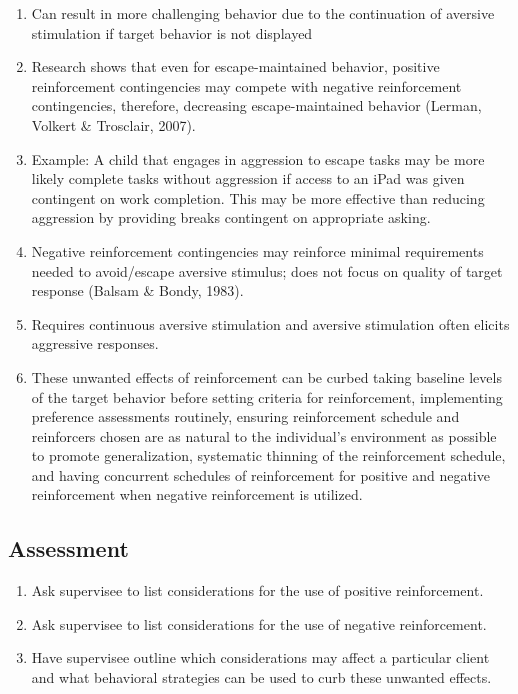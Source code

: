 \begin{enumerate}
\item Can result in more challenging behavior due to the continuation of aversive stimulation if target behavior is not displayed 
\item Research shows that even for escape-maintained behavior, positive reinforcement contingencies may compete with negative reinforcement contingencies, therefore, decreasing escape-maintained behavior (Lerman, Volkert \& Trosclair, 2007). 
\item Example: A child that engages in aggression to escape tasks may be more likely complete tasks without aggression if access to an iPad was given contingent on work completion. This may be more effective than reducing aggression by providing breaks contingent on appropriate asking.
\item Negative reinforcement contingencies may reinforce minimal requirements needed to avoid/escape aversive stimulus; does not focus on quality of target response (Balsam \& Bondy, 1983).
\item Requires continuous aversive stimulation and aversive stimulation often elicits aggressive responses.
\item These unwanted effects of reinforcement can be curbed taking baseline levels of the target behavior before setting criteria for reinforcement, implementing preference assessments routinely, ensuring reinforcement schedule and reinforcers chosen are as natural to the individual's environment as possible to promote generalization, systematic thinning of the reinforcement schedule, and having concurrent schedules of reinforcement for positive and negative reinforcement when negative reinforcement is utilized.
\end{enumerate}
%
\subsection{Assessment}
\begin{enumerate}
\item Ask supervisee to list considerations for the use of positive reinforcement.
\item Ask supervisee to list considerations for the use of negative reinforcement.
\item Have supervisee outline which considerations may affect a particular client and what behavioral strategies can be used to curb these unwanted effects.
\end{enumerate}
%
